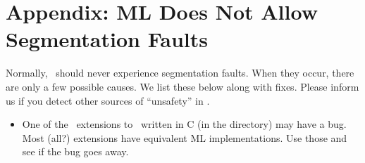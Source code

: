 \section{Appendix: ML Does Not Allow Segmentation Faults}

Normally, \ensemble\ should never experience segmentation faults.  When they occur,
there are only a few possible causes.  We list these below along with fixes.  Please
inform us if you detect other sources of ``unsafety'' in \ensemble.
\begin{itemize}
\item
One of the \ensemble\ extensions to \caml\ written in C (in the
 directory) may have a bug.  Most (all?) extensions have
equivalent ML implementations.  Use those and see if the bug goes away.
\end{itemize}

